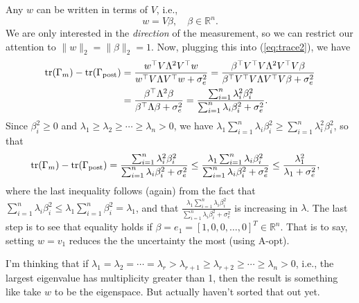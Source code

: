 \documentclass[pdflatex,sn-mathphys-num]{sn-jnl}
\theoremstyle{thmstyleone}%
\theoremstyle{thmstyletwo}%
\theoremstyle{thmstylethree}%
\begin{document}
Any $w$ can be written in terms of $V$, i.e., 
\[w=V\beta,\quad \beta\in\mathbb{R}^n.\]
We are only interested in the {\em direction} of the measurement, so we can restrict our attention to $\|w\|_2=\|\beta\|_2=1.$ Now, plugging this into (\ref{eq:trace2}), we have
\begin{align}
    \text{tr}(\Gamma_m)-\text{tr}(\Gamma_{\rm post})&=\frac{w^\top V\Lambda^2 V^\top w}{w^\top V\Lambda V^\top w+\sigma_e^2}=\frac{\beta^\top V^\top V\Lambda^2 V^\top V \beta}{\beta^\top V^\top V\Lambda V^\top  V \beta+\sigma_e^2}\nonumber\\
    &=\frac{\beta^\top \Lambda^2 \beta}{\beta^\top \Lambda\beta+\sigma_e^2}=\frac{\sum_{i=1}^n\lambda_i^2\beta_i^2}{\sum_{i=1}^n\lambda_i\beta_i^2+\sigma_e^2}\nonumber.
\end{align}
Since $\beta_i^2\geq0$ and $\lambda_1\geq\lambda_2\geq\cdots\geq\lambda_n>0$, we have $\lambda_1\sum_{i=1}^n\lambda_i\beta_i^2\geq\sum_{i=1}^n\lambda_i^2\beta_i^2$, so that
\begin{align}
    \text{tr}(\Gamma_m)-\text{tr}(\Gamma_{\rm post})&=\frac{\sum_{i=1}^n\lambda_i^2\beta_i^2}{\sum_{i=1}^n\lambda_i\beta_i^2+\sigma_e^2}\leq\frac{\lambda_1\sum_{i=1}^n\lambda_i\beta_i^2}{\sum_{i=1}^n\lambda_i\beta_i^2+\sigma_e^2}\leq\frac{\lambda_1^2}{\lambda_1+\sigma_e^2},\nonumber
\end{align}
where the last inequality follows (again) from the fact that $\sum_{i=1}^n\lambda_i\beta_i^2\leq\lambda_1\sum_{i=1}^n\beta_i^2=\lambda_1$, and that $\frac{\lambda_1\sum_{i=1}^n\lambda_i\beta_i^2}{\sum_{i=1}^n\lambda_i\beta_i^2+\sigma_e^2}$ is increasing in $\lambda$. The last step is to see that equality holds if $\beta=e_1=[1,0,0,\dots,0]^T\in\mathbb{R}^n$. That is to say, setting $w=v_1$ reduces the the uncertainty the most (using A-opt).

I'm thinking that if $\lambda_1=\lambda_2=\cdots=\lambda_r>\lambda_{r+1}\geq\lambda_{r+2}\geq\cdots\geq\lambda_n>0$, i.e., the largest eigenvalue has multiplicity greater than 1, then the result is something like take $w$ to be the eigenspace. But actually haven't sorted that out yet.
\end{document}
